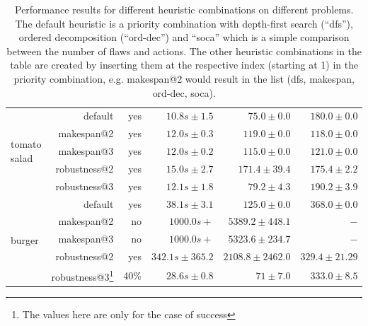 \begin{table}[t]
\begin{minipage}{\textwidth}
\begin{center}
\begin{tabular}{p{1.5cm}rrrrr}
    \multirow{5}{*}{\parbox{1.5cm}{tomato salad}} 
                                  & default                       & yes     & $10.8s\pm1.5 $              & $75.0\pm0.0$                         & $180.0 \pm0.0$               \\
                                  & makespan@2                    & yes     & $12.0s\pm0.3 $              & $119.0\pm0.0$                        & $118.0 \pm0.0$               \\
                                  & makespan@3                    & yes     & $12.0s\pm0.2 $              & $115.0\pm0.0$                        & $121.0 \pm0.0$               \\
                                  & robustness@2                  & yes     & $15.0s\pm2.7 $              & $171.4\pm39.4$                           & $175.4 \pm2.2$               \\
                                  & robustness@3                  & yes     & $12.1s\pm1.8 $              & $79.2\pm4.3$                            & $190.2 \pm3.9$               \\\hline
    \multirow{5}{*}{burger}       & default                       & yes     & $38.1s\pm 3.1$              & $125.0\pm0.0$                        & $368.0\pm0.0$                \\
                                  & makespan@2                    & no      & $1000.0s+$                  & $5389.2\pm448.1$                     & $-     $                     \\
                                  & makespan@3                    & no      & $1000.0s+ $                 & $5323.6\pm234.7$                     & $-     $                     \\
                                  & robustness@2                  & yes     & $342.1s\pm365.2 $           & $2108.8\pm2462.0$                    & $329.4 \pm21.29$             \\ 
                                  & robustness@3\footnote{The values here are only for the case of success}                  & 40\%    & $28.6s\pm0.8 $    & $71\pm 7.0$                          & $333.0 \pm 8.5$                                      
    \end{tabular}
    \caption[Performance results for different heuristic combinations]{Performance results for different heuristic combinations on different problems. The default heuristic is a priority combination with depth-first search (``dfs''), ordered decomposition (``ord-dec'') and ``soca'' which is a simple comparison between the number of flaws and actions. The other heuristic combinations in the table are created by inserting them at the respective index (starting at 1) in the priority combination, e.g. makespan@2 would result in the list (dfs, makespan, ord-dec, soca).}
    \label{tab:eval-heuristics}
    \end{center}
  \end{minipage}
  \end{table}

